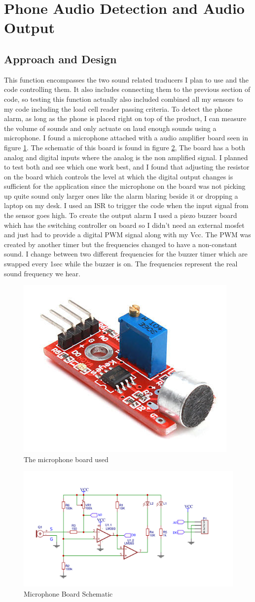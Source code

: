 \documentclass[11pt]{article}
\begin{document}
\section{Phone Audio Detection and Audio Output}
\subsection*{Approach and Design}
This function encompasses the two sound related traducers I plan to use and the code controlling them.
It also includes connecting them to the previous section of code, so testing this function actually also included combined all my sensors to my code including the load cell reader passing criteria.
To detect the phone alarm, as long as the phone is placed right on top of the product, I can measure the volume of sounds and only actuate on laud enough sounds using a microphone. 
I found a microphone attached with a audio amplifier board seen in figure \ref{fig:audioboard}.
The schematic of this board is found in figure \ref{fig:audioscem},
The board has a both analog and digital inputs where the analog is the non amplified signal.
I planned to test both and see which one work best, and I found that adjusting the resistor on the board which controls the level at which the digital output changes is sufficient for the application since the microphone on the board was not picking up quite sound only larger ones like the alarm blaring beside it or dropping a laptop on my desk. 
I used an ISR to trigger the code when the input signal from the sensor goes high.  
To create the output alarm I used a piezo buzzer board which has the switching controller on board so I didn't need an external mosfet and just had to provide a digital PWM signal along with my Vcc.
The PWM was created by another timer but the frequencies changed to have a non-constant sound.
I change between two different frequencies for the buzzer timer which are swapped every 1sec while the buzzer is on.
The frequencies represent the real sound frequency we hear.  

\begin{figure}[H]
	\centering
	\includegraphics[width = 0.2\linewidth]{soundsensor}
	\caption{The microphone board used}
	\label{fig:audioboard}
\end{figure}
\begin{figure}[H]
	\centering
	\includegraphics[width = 0.6\linewidth]{SoundScem}
	\caption{Microphone Board Schematic}
	\label{fig:audioscem}
\end{figure}
\end{document}
